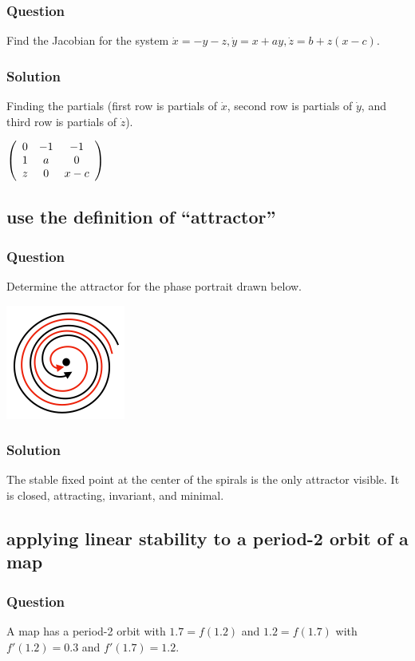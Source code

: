 \documentclass[12pt,letterpaper,noanswers]{exam}
\begin{document}
\subsubsection{Question}
Find the Jacobian for the system $\dot x = -y-z, \dot y = x + ay, \dot z = b + z(x-c).$

\subsubsection{Solution}
Finding the partials (first row is partials of $\dot x$, second row is partials of $\dot y$, and third row is partials of $\dot z$).

$\left(\begin{array}{c c c} 0 & -1 & -1 \\ 1 & a & 0 \\ z & 0 & x-c\end{array}\right)$

\subsection{use the definition of ``attractor''}
\subsubsection{Question}
Determine the attractor for the phase portrait drawn below.

\includegraphics[]{img/C26-2019-11-06p2.png}

\subsubsection{Solution}
The stable fixed point at the center of the spirals is the only attractor visible.  It is closed, attracting, invariant, and minimal.

\subsection{applying linear stability to a period-2 orbit of a map}
\subsubsection{Question}
A map has a period-2 orbit with $1.7 = f(1.2)$ and $1.2 = f(1.7)$ with $f'(1.2) = 0.3$ and $f'(1.7) = 1.2$.
\end{document}
